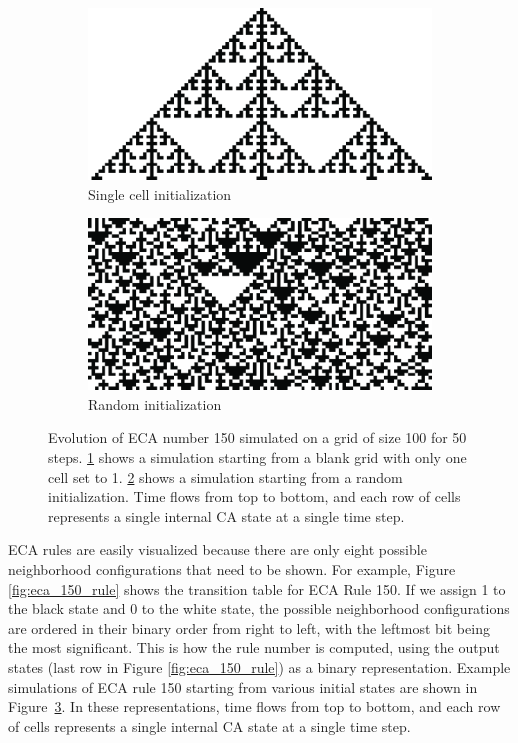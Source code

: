 \begin{figure}[htbp]
\begin{subfigure}[t]{.04\linewidth}
  \caption*{}
\end{subfigure}
\begin{subfigure}[t]{.45\linewidth}
  \centering
  \includegraphics[width=\linewidth]{figures/eca_150_single.pdf}
  \caption{Single cell initialization}
  \label{fig:eca_150_single}
\end{subfigure}
\begin{subfigure}[t]{.45\linewidth}
  \centering
  \includegraphics[width=\linewidth]{figures/eca_150_random.pdf}
  \caption{Random initialization}
  \label{fig:eca_150_random}
\end{subfigure}
\caption{Evolution of \ac{ECA} number 150 simulated on a grid of size 100 for 50
  steps. \ref{fig:eca_150_single} shows a simulation starting from a blank grid
  with only one cell set to 1. \ref{fig:eca_150_random} shows a simulation
  starting from a random initialization. Time flows from top to bottom, and each row of cells represents a single internal CA state at a single time step.}
  \label{fig:eca_150}
\end{figure}


\ac{ECA} rules are easily visualized because there are only eight possible
neighborhood configurations that need to be shown. For example, Figure
\ref{fig:eca_150_rule} shows the transition table for \ac{ECA} Rule 150. If we
assign 1 to the black state and 0 to the white state, the possible neighborhood
configurations are ordered in their binary order from right to left, with the
leftmost bit being the most significant. This is how the rule number is
computed, using the output states (last row in Figure \ref{fig:eca_150_rule}) as
a binary representation. Example simulations of \ac{ECA} rule 150 starting 
from various initial states are shown in Figure~\ref{fig:eca_150}. In these 
representations, time flows from top to bottom, and each row of cells represents 
a single internal \ac{CA} state at a single time step.

